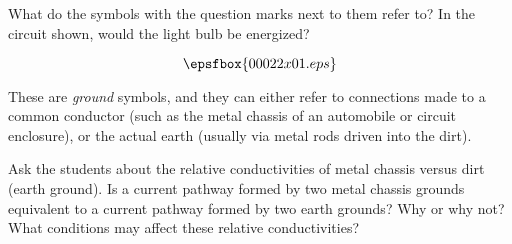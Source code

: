 

What do the symbols with the question marks next to them refer to?  In the circuit shown, would the light bulb be energized?

$$\epsfbox{00022x01.eps}$$







These are {\it ground} symbols, and they can either refer to connections made to a common conductor (such as the metal chassis of an automobile or circuit enclosure), or the actual earth (usually via metal rods driven into the dirt).







Ask the students about the relative conductivities of metal chassis versus dirt (earth ground).  Is a current pathway formed by two metal chassis grounds equivalent to a current pathway formed by two earth grounds?  Why or why not?  What conditions may affect these relative conductivities?





